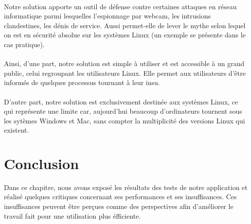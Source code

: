 			\paragraph{}
				Notre solution apporte un outil de défense contre certaines attaques en réseau informatique parmi lesquelles l'espionnage par webcam, les intrusions clandestines, les dénis de service. Aussi permet-elle de lever le mythe selon lequel on est en sécurité absolue sur les systèmes Linux (un exemple se présente dans le cas pratique).
			\paragraph{}
				Ainsi, d'une part, notre solution est simple à utiliser et est accessible à un grand public, celui regroupant les utilisateurs Linux.
				Elle permet aux utilisateurs d'être informés de quelques processus tournant à leur insu.  
			\paragraph{}
				D'autre part, notre solution est exclusivement destinée aux systèmes Linux, ce qui représente une limite car, aujourd'hui beaucoup d'ordinateurs tournent sous les sytèmes Windows et Mac, sans compter la multiplicité des versions Linux qui existent.  
\section*{Conclusion}
			\paragraph{}
				Dans ce chapitre, nous avons exposé les résultats des tests de notre application et réalisé quelques critiques concernant ses performances et ses insuffisances. Ces insuffisances peuvent être perçues comme des perspectives afin d'améliorer le travail fait pour une utilisation plus éfficiente.